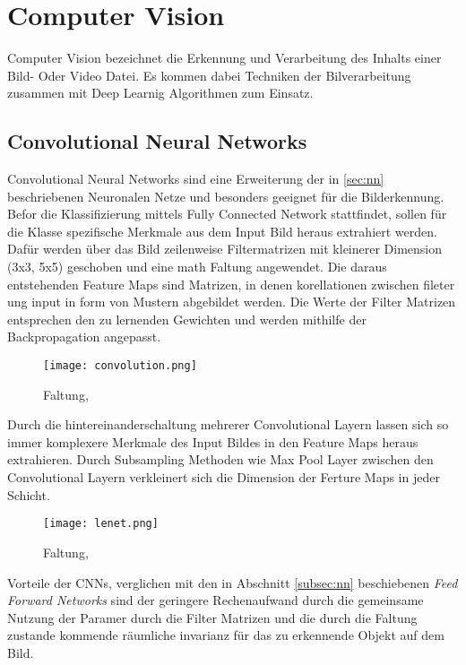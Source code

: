 \section{Computer Vision}

Computer Vision bezeichnet die Erkennung und 
Verarbeitung des Inhalts einer Bild- Oder Video 
Datei. Es kommen dabei Techniken der Bilverarbeitung
zusammen mit Deep Learnig Algorithmen zum Einsatz.


\subsection{Convolutional Neural Networks}\label{subsec:cnn}

Convolutional Neural Networks sind eine Erweiterung 
der in \ref{sec:nn} beschriebenen Neuronalen Netze 
und besonders geeignet für die Bilderkennung.
Befor die Klassifizierung mittels Fully Connected Network 
stattfindet, sollen für die Klasse spezifische Merkmale 
aus dem Input Bild heraus extrahiert werden.
Dafür werden über das Bild zeilenweise Filtermatrizen mit kleinerer Dimension
(3x3, 5x5) geschoben und eine math Faltung angewendet.
Die daraus entstehenden Feature Maps sind Matrizen, in denen 
korellationen zwischen fileter ung input in form von 
Mustern abgebildet werden.
Die Werte der Filter Matrizen entsprechen den zu lernenden Gewichten 
und werden mithilfe der Backpropagation angepasst.

\begin{figure}[H]
    \centering
    \label{fig:conv}
    \texttt{[image: convolution.png]}
    \caption{Faltung, \cite{researcherSimpleIntroductionConvolutional2019}}
\end{figure}


Durch die hintereinanderschaltung mehrerer Convolutional Layern 
lassen sich so immer komplexere Merkmale des Input Bildes in den 
Feature Maps heraus extrahieren.
Durch Subsampling Methoden wie Max Pool Layer zwischen den Convolutional
Layern verkleinert sich die Dimension der Ferture Maps in jeder Schicht.


\begin{figure}[H]
    \centering
    \label{fig:lenet}
    \texttt{[image: lenet.png]}
    \caption{Faltung, \cite{lecunGradientBasedLearningApplied1998}}
\end{figure}


Vorteile der CNNs, verglichen mit den in Abschnitt \ref{subsec:nn} beschiebenen 
\textit{Feed Forward Networks} sind der geringere Rechenaufwand
durch die gemeinsame Nutzung der Paramer durch die Filter Matrizen und die durch die 
Faltung zustande kommende räumliche invarianz für das zu erkennende 
Objekt auf dem Bild.

